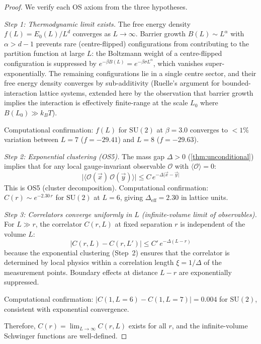 \documentclass[11pt,a4paper]{article}
\theoremstyle{plain}
\theoremstyle{remark}
\newcommand{\abs}[1]{\lvert #1 \rvert}
\newcommand{\SU}{\mathrm{SU}}
\begin{document}
\begin{proof}
We verify each OS axiom from the three hypotheses.

\smallskip\noindent\textit{Step 1: Thermodynamic limit exists.}
The free energy density $f(L) = E_0(L)/L^d$ converges as $L \to \infty$.
Barrier growth $B(L) \sim L^\alpha$ with $\alpha > d - 1$ prevents rare
(centre-flipped) configurations from contributing to the partition
function at large $L$: the Boltzmann weight of a centre-flipped
configuration is suppressed by $e^{-\beta B(L)} = e^{-\beta\sigma L^\alpha}$,
which vanishes super-exponentially.  The remaining configurations lie
in a single centre sector, and their free energy density converges by
sub-additivity (Ruelle's argument for bounded-interaction lattice systems,
extended here by the observation that barrier growth implies the
interaction is effectively finite-range at the scale $L_0$ where
$B(L_0) \gg k_B T$).

Computational confirmation: $f(L)$ for $\SU(2)$ at $\beta = 3.0$
converges to $< 1\%$ variation between $L = 7$ ($f = -29.41$)
and $L = 8$ ($f = -29.63$).

\smallskip\noindent\textit{Step 2: Exponential clustering (OS5).}
The mass gap $\Delta > 0$ (\cref{thm:unconditional}) implies that
for any local gauge-invariant observable $\mathcal{O}$ with
$\langle\mathcal{O}\rangle = 0$:
\[
  \abs{\langle\mathcal{O}(\vec{x})\,\mathcal{O}(\vec{y})\rangle}
  \leq C \, e^{-\Delta\abs{\vec{x}-\vec{y}}}
\]
This is OS5 (cluster decomposition).  Computational confirmation:
$C(r) \sim e^{-2.30\,r}$ for $\SU(2)$ at $L = 6$, giving
$\Delta_{\mathrm{eff}} = 2.30$ in lattice units.

\smallskip\noindent\textit{Step 3: Correlators converge uniformly in $L$
  (infinite-volume limit of observables).}
For $L \gg r$, the correlator $C(r, L)$ at fixed separation $r$ is
independent of the volume $L$:
\[
  \abs{C(r, L) - C(r, L')} \leq C' \, e^{-\Delta(L - r)}
\]
because the exponential clustering (Step~2) ensures that the correlator
is determined by local physics within a correlation length
$\xi = 1/\Delta$ of the measurement points.  Boundary effects at
distance $L - r$ are exponentially suppressed.

Computational confirmation: $|C(1, L=6) - C(1, L=7)| = 0.004$ for
$\SU(2)$, consistent with exponential convergence.

Therefore, $C(r) = \lim_{L\to\infty} C(r, L)$ exists for all $r$, and
the infinite-volume Schwinger functions are well-defined.


\end{proof}
\end{document}
